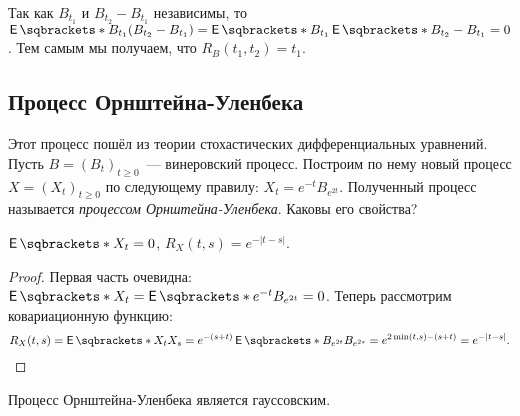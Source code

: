 Так как \(B_{t_{1}}\) и \(B_{t_{2}} - B_{t_{1}}\) независимы, то 
\(\E{B_{t_{1}}(B_{t_{2}} - B_{t_{1}})} = \E{B_{t_{1}}}\E{B_{t_{2}} - 
B_{t_{1}}} = 0\). Тем самым мы получаем, что \(R_{B}(t_{1}, t_{2}) = t_{1}\).

\subsection{Процесс Орнштейна-Уленбека}\label{ornstein-uhlenbeck-process}
Этот процесс пошёл из теории стохастических дифференциальных уравнений. Пусть 
\(B = (B_{t})_{t \geq 0}\)~--- винеровский процесс. Построим по нему новый 
процесс \(X = (X_{t})_{t \geq 0}\) по следующему правилу: \(X_{t} = 
e^{-t}B_{e^{2t}}\). Полученный процесс называется \emph{процессом 
Орнштейна-Уленбека}. Каковы его свойства?

\begin{property}
	\(\E{X_{t}} = 0\), \(R_{X}(t, s) = e^{-|t - s|}\).
\end{property}
\begin{proof}
	Первая часть очевидна: \(\E{X_{t}} = \E{e^{-t}B_{e^{2t}}} = 0\). Теперь 
	рассмотрим ковариационную функцию:
	\[
		R_{X}(t, s) = \E{X_{t}X_{s}} = e^{-(s + t)}\E{B_{e^{2t}}B_{e^{2s}}} = 
		e^{2\min(t, s) - (s + t)} = e^{-|t - s|}. \qedhere
	\]
\end{proof}
\begin{property}
	Процесс Орнштейна-Уленбека является гауссовским.
\end{property}

